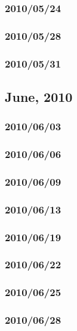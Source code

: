 \documentclass{article}
\begin{document}
\subsubsection{2010/05/24}

\subsubsection{2010/05/28}

\subsubsection{2010/05/31}

\subsection{June, 2010}
\subsubsection{2010/06/03}

\subsubsection{2010/06/06}

\subsubsection{2010/06/09}

\subsubsection{2010/06/13}

\subsubsection{2010/06/19}

\subsubsection{2010/06/22}

\subsubsection{2010/06/25}

\subsubsection{2010/06/28}
\end{document}
